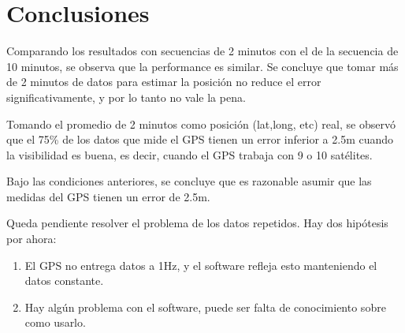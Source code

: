 \documentclass[spanish,12pt,a4paper,titlepage]{report}
\begin{document}
\newpage
\section{Conclusiones}
\label{sec:conclusion}

Comparando los resultados con secuencias de 2 minutos con el de la secuencia de 10 minutos, se observa que la performance es similar. Se concluye que tomar más de 2 minutos de datos para estimar la posición no reduce el error significativamente, y por lo tanto no vale la pena.

Tomando el promedio de 2 minutos como posición (lat,long, etc) real, se observó que el 75\% de los datos que mide el GPS tienen un error inferior a 2.5m cuando la visibilidad es buena, es decir, cuando el GPS trabaja con 9 o 10 satélites.

Bajo las condiciones anteriores, se concluye que es razonable asumir que las medidas del GPS tienen un error de 2.5m.

Queda pendiente resolver el problema de los datos repetidos. Hay dos hipótesis por ahora:
\begin{enumerate}
\item El GPS no entrega datos a 1Hz, y el software refleja esto manteniendo el datos constante.
\item Hay algún problema con el software, puede ser falta de conocimiento sobre como usarlo.
\end{enumerate}
\end{document}

